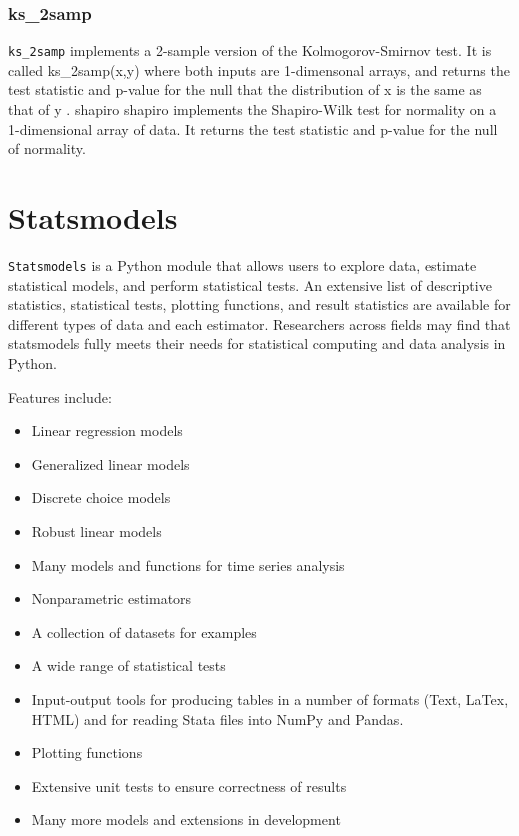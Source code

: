 \documentclass[KSmain.tex]{subfiles}
\begin{document}
\subsubsection{ks\_2samp}
\texttt{ks\_2samp} implements a 2-sample version of the Kolmogorov-Smirnov test. It is called ks\_2samp(x,y)
where both inputs are 1-dimensonal arrays, and returns the test statistic and p-value for the null that
the distribution of x is the same as that of y .
shapiro
shapiro implements the Shapiro-Wilk test for normality on a 1-dimensional array of data. It returns the
test statistic and p-value for the null of normality.

\newpage
\section{Statsmodels}
\texttt{Statsmodels} is a Python module that allows users to explore data, estimate statistical models, and perform statistical tests. 
An extensive list of descriptive statistics, statistical tests, plotting functions, and result statistics are available for different types of 
data and each estimator. Researchers across fields may find that statsmodels fully meets their needs for statistical computing and data analysis 
in Python. 

Features include:


\begin{itemize}

\item Linear regression models

\item Generalized linear models

\item Discrete choice models

\item Robust linear models

\item Many models and functions for time series analysis

\item Nonparametric estimators

\item A collection of datasets for examples

\item A wide range of statistical tests

\item Input-output tools for producing tables in a number of formats (Text, LaTex, HTML) and for reading Stata files into NumPy and Pandas.

\item Plotting functions

\item Extensive unit tests to ensure correctness of results

\item Many more models and extensions in development

\end{itemize}
\end{document}
